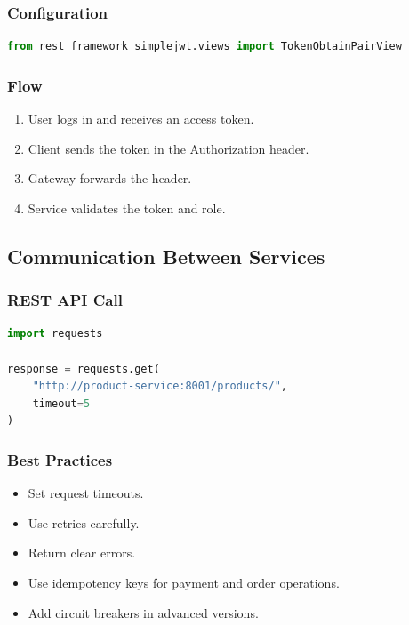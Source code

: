 \documentclass[12pt,a4paper]{article}
\begin{document}
\subsubsection{Configuration}

\begin{lstlisting}[language=Python,caption={JWT view configuration.}]
from rest_framework_simplejwt.views import TokenObtainPairView
\end{lstlisting}

\subsubsection{Flow}

\begin{enumerate}[label=\arabic*.]
    \item User logs in and receives an access token.
    \item Client sends the token in the Authorization header.
    \item Gateway forwards the header.
    \item Service validates the token and role.
\end{enumerate}

\subsection{Communication Between Services}

\subsubsection{REST API Call}

\begin{lstlisting}[language=Python,caption={REST call between services.}]
import requests

response = requests.get(
    "http://product-service:8001/products/",
    timeout=5
)
\end{lstlisting}

\subsubsection{Best Practices}

\begin{itemize}
    \item Set request timeouts.
    \item Use retries carefully.
    \item Return clear errors.
    \item Use idempotency keys for payment and order operations.
    \item Add circuit breakers in advanced versions.
\end{itemize}
\end{document}
